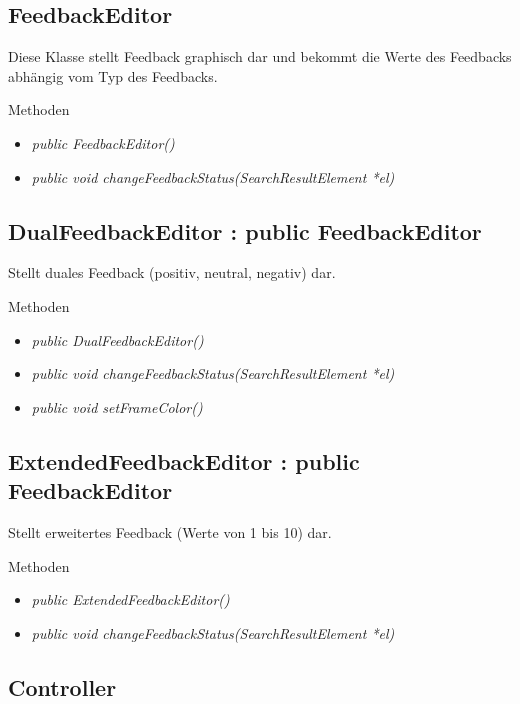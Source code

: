 \subsection*{FeedbackEditor}
Diese Klasse stellt Feedback graphisch dar und bekommt die Werte des Feedbacks abhängig vom Typ des Feedbacks.

Methoden
\begin{itemize}
	\item\textit{public FeedbackEditor()}
	\item\textit{public void changeFeedbackStatus(SearchResultElement *el)}
\end{itemize}

\subsection*{DualFeedbackEditor : public FeedbackEditor}
Stellt duales Feedback (positiv, neutral, negativ) dar.

Methoden
\begin{itemize}
	\item\textit{public DualFeedbackEditor()}
	\item\textit{public void changeFeedbackStatus(SearchResultElement *el)}
	\item\textit{public void setFrameColor()}
\end{itemize}

\subsection*{ExtendedFeedbackEditor : public FeedbackEditor}
Stellt erweitertes Feedback (Werte von 1 bis 10) dar.

Methoden
\begin{itemize}
	\item\textit{public ExtendedFeedbackEditor()}
	\item\textit{public void changeFeedbackStatus(SearchResultElement *el)}
\end{itemize}

\pagebreak

\subsection{Controller}

